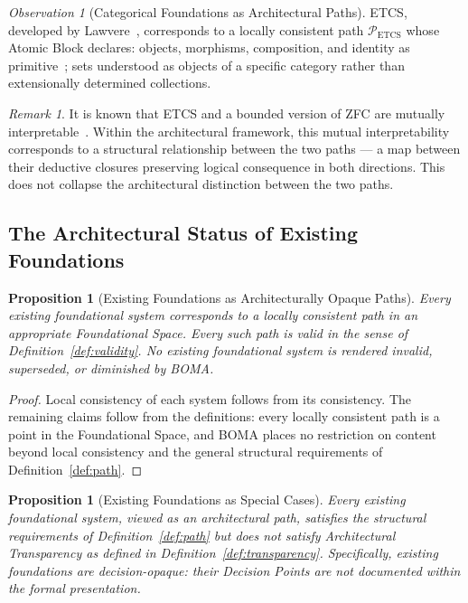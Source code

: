 \documentclass[12pt, a4paper]{article}
\theoremstyle{plain}
\newtheorem{proposition}[theorem]{Proposition}
\theoremstyle{definition}
\theoremstyle{remark}
\newtheorem{remark}[theorem]{Remark}
\newtheorem{observation}[theorem]{Observation}
\newcommand{\BOMA}{\textsf{BOMA}}
\begin{document}
\begin{observation}[Categorical Foundations as Architectural Paths]
\label{obs:etcs-path}
ETCS, developed by Lawvere~\cite{Lawvere1964}, corresponds to a locally
consistent path $\mathcal{P}_{\mathrm{ETCS}}$ whose Atomic Block declares:
objects, morphisms, composition, and identity as primitive~\cite{MacLane1971,Awodey2010};
sets understood as objects of a specific category rather than extensionally
determined collections.
\end{observation}

\begin{remark}
It is known that ETCS and a bounded version of ZFC are mutually
interpretable~\cite{Lawvere1964,McLarty1991}. Within the architectural
framework, this mutual interpretability corresponds to a structural
relationship between the two paths --- a map between their deductive
closures preserving logical consequence in both directions. This does
not collapse the architectural distinction between the two paths.
\end{remark}

\subsection{The Architectural Status of Existing Foundations}
\label{subsec:arch-status}

\begin{proposition}[Existing Foundations as Architecturally Opaque Paths]
\label{prop:opaque}
Every existing foundational system corresponds to a locally consistent
path in an appropriate Foundational Space. Every such path is valid in
the sense of Definition~\ref{def:validity}. No existing foundational
system is rendered invalid, superseded, or diminished by \BOMA{}.
\end{proposition}

\begin{proof}
Local consistency of each system follows from its consistency. The
remaining claims follow from the definitions: every locally consistent
path is a point in the Foundational Space, and \BOMA{} places no
restriction on content beyond local consistency and the general
structural requirements of Definition~\ref{def:path}.
\end{proof}

\begin{proposition}[Existing Foundations as Special Cases]
\label{prop:special-cases}
Every existing foundational system, viewed as an architectural path,
satisfies the structural requirements of Definition~\ref{def:path} but
does not satisfy Architectural Transparency as defined in
Definition~\ref{def:transparency}. Specifically, existing foundations
are decision-opaque: their Decision Points are not documented within
the formal presentation.
\end{proposition}
\end{document}
